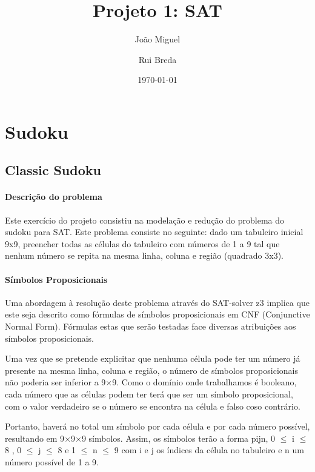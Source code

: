 \documentclass[a4paper,12pt]{article}
\begin{document}
\title{Projeto 1: SAT}
\author{João Miguel \and Rui Breda}
\date{\today}
\maketitle
\section{Sudoku}
\subsection{Classic Sudoku}
\paragraph{Descrição do problema \newline}
Este exercício do projeto consistiu na modelação e redução do problema do sudoku para SAT. Este problema consiste no seguinte: dado um tabuleiro inicial 9x9, preencher todas as células do tabuleiro com números de 1 a 9 tal que nenhum número se repita na mesma linha, coluna e região (quadrado 3x3).
\paragraph{Símbolos Proposicionais \newline}
Uma abordagem à resolução deste problema através do SAT-solver z3 implica que este seja descrito como fórmulas de símbolos proposicionais em CNF (Conjunctive Normal Form). Fórmulas estas que serão testadas face diversas atribuições aos símbolos proposicionais.\newline

Uma vez que se pretende explicitar que nenhuma célula pode ter um número já presente na mesma linha, coluna e região, o número de símbolos proposicionais não poderia ser inferior a 9$\times$9. Como o domínio onde trabalhamos é booleano, cada número que as células podem ter terá que ser um símbolo proposicional, com o valor verdadeiro se o número se encontra na célula e falso coso contrário.\newline
 
Portanto, haverá no total um símbolo por cada célula e por cada número possível, resultando em 9$\times$9$\times$9 símbolos. Assim, os símbolos terão a forma p\textunderscore i\textunderscore j\textunderscore n, 0 $\leq$ i $\leq$ 8 , 0 $\leq$ j $\leq$ 8 e 1 $\leq$ n $\leq$ 9 com i e j os índices da célula no tabuleiro e n um número possível de 1 a 9.
\end{document}
